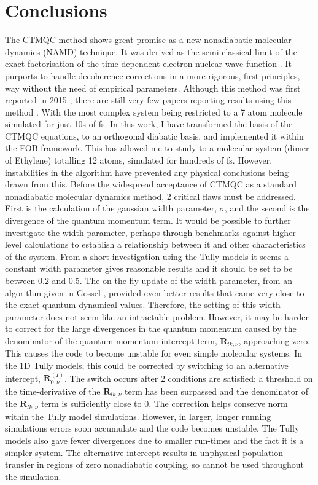 \section{Conclusions}
The CTMQC method shows great promise as a new nonadiabatic molecular dynamics (NAMD) technique. It was derived as the semi-classical limit of the exact factorisation of the time-dependent electron-nuclear wave function \cite{abedi_exact_2010, agostini_semiclassical_2015}. It purports to handle decoherence corrections in a more rigorous, first principles, way without the need of empirical parameters. Although this method was first reported in 2015 \cite{agostini_semiclassical_2015}, there are still very few papers reporting results using this method \cite{min_ab_2017, gossel_coupled-trajectory_2018,agostini_semiclassical_2015}. With the most complex system being restricted to a 7 atom molecule simulated for just 10s of fs\cite{min_ab_2017}. In this work, I have transformed the basis of the CTMQC equations, to an orthogonal diabatic basis, and implemented it within the FOB framework. This has allowed me to study to a molecular system (dimer of Ethylene) totalling 12 atoms, simulated for hundreds of fs. However, instabilities in the algorithm have prevented any physical conclusions being drawn from this. Before the widespread acceptance of CTMQC as a standard nonadiabatic molecular dynamics method, 2 critical flaws must be addressed. First is the calculation of the gaussian width parameter, $\sigma$, and the second is the divergence of the quantum momentum term. It would be possible to further investigate the width parameter, perhaps through benchmarks against higher level calculations to establish a relationship between it and other characteristics of the system. From a short investigation using the Tully models it seems a constant width parameter gives reasonable results and it should be set to be between 0.2 and 0.5. The on-the-fly update of the width parameter, from an algorithm given in Gossel \cite{gossel_coupled-trajectory_2018}, provided even better results that came very close to the exact quantum dynamical values. Therefore, the setting of this width parameter does not seem like an intractable problem. However, it may be harder to correct for the large divergences in the quantum momentum caused by the denominator of the quantum momentum intercept term, $\mathbf{R}_{lk, \nu}$, approaching zero. This causes the code to become unstable for even simple molecular systems. In the 1D Tully models, this could be corrected by switching to an alternative intercept, $\mathbf{R}_{0, \nu}^{(I)}$. The switch occurs after 2 conditions are satisfied: a threshold on the time-derivative of the $\mathbf{R}_{lk, \nu}$ term has been surpassed and the denominator of the $\mathbf{R}_{lk, \nu}$ term is sufficiently close to 0. The correction helps conserve norm within the Tully model simulations. However, in larger, longer running simulations errors soon accumulate and the code becomes unstable. The Tully models also gave fewer divergences due to smaller run-times and the fact it is a simpler system. The alternative intercept results in unphysical population transfer in regions of zero nonadiabatic coupling, so cannot be used throughout the simulation.
